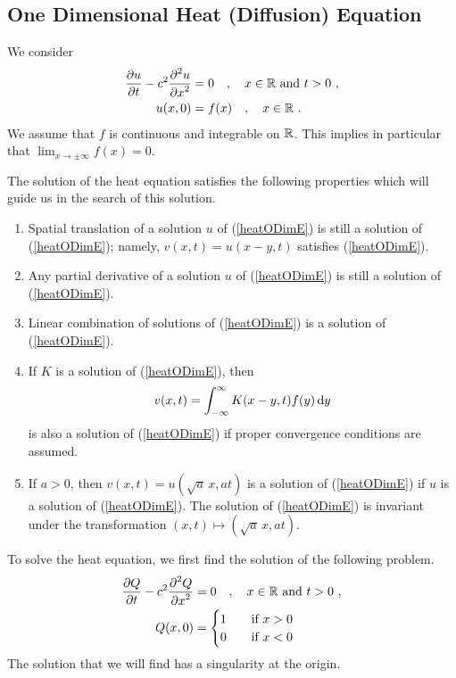 \subsection{One Dimensional Heat (Diffusion) Equation}

We consider
\begin{align}
\frac{\partial{u}}{\partial t} - c^2 \frac{\displaystyle \partial^{2}{u}} {\displaystyle \partial x^{2}} &= 0 \quad , \quad x\in \mathbb{R}
\ \text{and} \ t > 0 \ , \label{heatODimE} \\
u(x,0) &= f(x) \quad , \quad x \in \mathbb{R} \ . \label{heatODimIC}
\end{align}
We assume that $f$ is continuous and integrable on $\mathbb{R}$.  This
implies in particular that $\displaystyle \lim_{x\to \pm \infty} f(x) = 0$.

The solution of the heat equation satisfies the following properties
which will guide us in the search of this solution.

\begin{enumerate}
\item Spatial translation of a solution $u$ of (\ref{heatODimE})
is still a solution of (\ref{heatODimE}); namely, $v(x,t) = u(x-y,t)$
satisfies (\ref{heatODimE}).
\item Any partial derivative of a solution $u$ of (\ref{heatODimE})
is still a solution of (\ref{heatODimE}).
\item Linear combination of solutions of (\ref{heatODimE}) is a
solution of (\ref{heatODimE}).
\item If $K$ is a solution of (\ref{heatODimE}), then
\[
v(x,t) = \int_{-\infty}^\infty K(x-y,t) f(y) \,\mathrm{d}{y}
\]
is also a solution of (\ref{heatODimE}) if proper convergence
conditions are assumed.
\item If $a>0$, then $v(x,t) = u(\sqrt{a}\,x, at)$ is a solution of
(\ref{heatODimE}) if $u$ is a solution of (\ref{heatODimE}).  The
solution of (\ref{heatODimE}) is invariant under the transformation
$(x,t) \mapsto (\sqrt{a}\,x, at)$.
\end{enumerate}

To solve the heat equation, we first find the solution of the
following problem.
\begin{align}
\frac{\partial{Q}}{\partial t} - c^2 \frac{\displaystyle \partial^{2}{Q}} {\displaystyle \partial x^{2}} &= 0 \quad , \quad x\in \mathbb{R}
\ \text{and} \ t>0 \ , \label{heatODimQE} \\
Q(x,0) &= \begin{cases}
1 & \quad \text{if} \ x > 0 \\
0 & \quad \text{if} \ x < 0
\end{cases} \label{heatODimQC}
\end{align}
The solution that we will find has a singularity at the origin.

